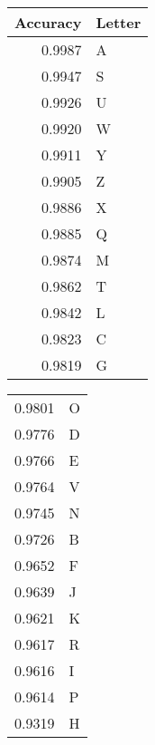\begin{tabular}{rl}
\toprule
  Accuracy & Letter \\
\midrule
    0.9987 &      A \\
    0.9947 &      S \\
    0.9926 &      U \\
    0.9920 &      W \\
    0.9911 &      Y \\
    0.9905 &      Z \\
    0.9886 &      X \\
    0.9885 &      Q \\
    0.9874 &      M \\
    0.9862 &      T \\
    0.9842 &      L \\
    0.9823 &      C \\
    0.9819 &      G \\
    \bottomrule
\end{tabular}
    \begin{tabular}{rl}
\toprule
   &  \\
\midrule
    0.9801 &      O \\
    0.9776 &      D \\
    0.9766 &      E \\
    0.9764 &      V \\
    0.9745 &      N \\
    0.9726 &      B \\
    0.9652 &      F \\
    0.9639 &      J \\
    0.9621 &      K \\
    0.9617 &      R \\
    0.9616 &      I \\
    0.9614 &      P \\
    0.9319 &      H \\
\bottomrule
\end{tabular}
